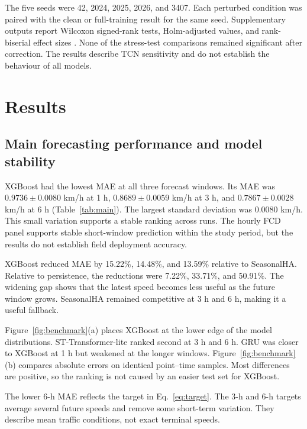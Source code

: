 \documentclass[smallcondensed]{svjour3}
\begin{document}
The five seeds were 42, 2024, 2025, 2026, and 3407. Each perturbed condition was paired with the clean or full-training result for the same seed. Supplementary outputs report Wilcoxon signed-rank tests, Holm-adjusted values, and rank-biserial effect sizes \cite{ref20,ref21}. None of the stress-test comparisons remained significant after correction. The results describe TCN sensitivity and do not establish the behaviour of all models.
\section{Results}
\subsection{Main forecasting performance and model stability}
XGBoost had the lowest MAE at all three forecast windows. Its MAE was $0.9736\pm0.0080$ km/h at 1 h, $0.8689\pm0.0059$ km/h at 3 h, and $0.7867\pm0.0028$ km/h at 6 h (Table~\ref{tab:main}). The largest standard deviation was 0.0080 km/h. This small variation supports a stable ranking across runs. The hourly FCD panel supports stable short-window prediction within the study period, but the results do not establish field deployment accuracy.

XGBoost reduced MAE by 15.22\%, 14.48\%, and 13.59\% relative to SeasonalHA. Relative to persistence, the reductions were 7.22\%, 33.71\%, and 50.91\%. The widening gap shows that the latest speed becomes less useful as the future window grows. SeasonalHA remained competitive at 3 h and 6 h, making it a useful fallback.

Figure~\ref{fig:benchmark}(a) places XGBoost at the lower edge of the model distributions. ST-Transformer-lite ranked second at 3 h and 6 h. GRU was closer to XGBoost at 1 h but weakened at the longer windows. Figure~\ref{fig:benchmark}(b) compares absolute errors on identical point--time samples. Most differences are positive, so the ranking is not caused by an easier test set for XGBoost.

The lower 6-h MAE reflects the target in Eq.~\eqref{eq:target}. The 3-h and 6-h targets average several future speeds and remove some short-term variation. They describe mean traffic conditions, not exact terminal speeds.
\end{document}
